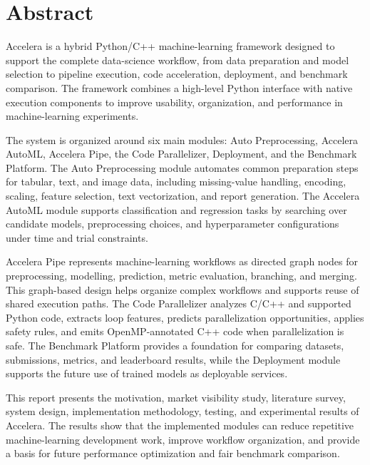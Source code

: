 \documentclass[12pt,a4paper]{report}
\newcommand{\project}{Accelera}
\begin{document}
\setcounter{page}{2}

\chapter*{Abstract}

\project{} is a hybrid Python/C++ machine-learning framework designed to support
the complete data-science workflow, from data preparation and model selection to
pipeline execution, code acceleration, deployment, and benchmark comparison. The
framework combines a high-level Python interface with native execution
components to improve usability, organization, and performance in machine-learning
experiments.

\medskip
\noindent The system is organized around six main modules: Auto Preprocessing, Accelera
AutoML, Accelera Pipe, the Code Parallelizer, Deployment, and the Benchmark
Platform. The Auto Preprocessing module automates common preparation steps for
tabular, text, and image data, including missing-value handling, encoding,
scaling, feature selection, text vectorization, and report generation. The
Accelera AutoML module supports classification and regression tasks by searching
over candidate models, preprocessing choices, and hyperparameter configurations
under time and trial constraints.

\medskip
\noindent Accelera Pipe represents machine-learning workflows as directed graph nodes for
preprocessing, modelling, prediction, metric evaluation, branching, and merging.
This graph-based design helps organize complex workflows and supports reuse of
shared execution paths. The Code Parallelizer analyzes C/C++ and supported Python
code, extracts loop features, predicts parallelization opportunities, applies
safety rules, and emits OpenMP-annotated C++ code when parallelization is safe.
The Benchmark Platform provides a foundation for comparing datasets,
submissions, metrics, and leaderboard results, while the Deployment module
supports the future use of trained models as deployable services.

\medskip
\noindent This report presents the motivation, market visibility study, literature survey,
system design, implementation methodology, testing, and experimental results of
Accelera. The results show that the implemented modules can reduce repetitive
machine-learning development work, improve workflow organization, and provide a
basis for future performance optimization and fair benchmark comparison.
\end{document}
